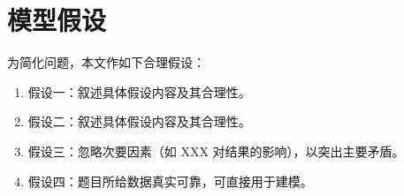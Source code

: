 \section{模型假设}

为简化问题，本文作如下合理假设：

\begin{enumerate}
    \item 假设一：叙述具体假设内容及其合理性。
    \item 假设二：叙述具体假设内容及其合理性。
    \item 假设三：忽略次要因素（如 XXX 对结果的影响），以突出主要矛盾。
    \item 假设四：题目所给数据真实可靠，可直接用于建模。
\end{enumerate}
